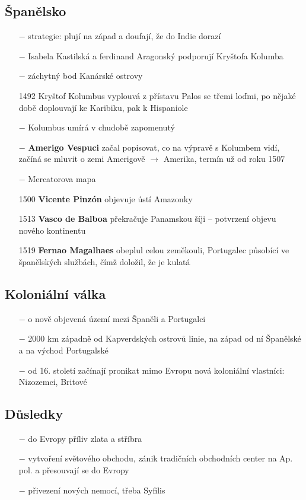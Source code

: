 \documentclass{article}
\begin{document}
\subsection*{Španělsko}
\begin{itemize}
    \vspace{-0.5em}
    \setlength\itemsep{0.15em}
    \item[$-$] strategie: plují na západ a doufají, že do Indie dorazí
    \item[$-$] Isabela Kastilská a ferdinand Aragonský podporují Kryštofa Kolumba
    \item[$-$] záchytný bod Kanárské ostrovy
    \item[1492] Kryštof Kolumbus vyplouvá z přístavu Palos se třemi loďmi, po nějaké době doplouvají ke Karibiku, pak k Hispaniole
    \item[$-$] Kolumbus umírá v chudobě zapomenutý
    \item[$-$] \textbf{Amerigo Vespuci} začal popisovat, co na výpravě s Kolumbem vidí, začíná se mluvit o zemi Amerigově $\rightarrow$ Amerika, termín už od roku 1507
    \item[$-$] Mercatorova mapa
    \item[1500] \textbf{Vicente Pinzón} objevuje ústí Amazonky
    \item[1513] \textbf{Vasco de Balboa} překračuje Panamskou šíji -- potvrzení objevu nového kontinentu
    \item[1519] \textbf{Fernao Magalhaes} obeplul celou zeměkouli, Portugalec působící ve španělských službách, čímž doložil, že je kulatá
\end{itemize}


\subsection*{Koloniální válka}
\begin{itemize}
    \vspace{-0.5em}
    \setlength\itemsep{0.15em}
    \item[$-$] o nově objevená území mezi Španěli a Portugalci
    \item[$-$] 2000 km západně od Kapverdských ostrovů linie, na západ od ní Španělské a na východ Portugalské
    \item[$-$] od 16. století začínají pronikat mimo Evropu nová koloniální vlastníci: Nizozemci, Britové
\end{itemize}

\subsection*{Důsledky}
\begin{itemize}
    \vspace{-0.5em}
    \setlength\itemsep{0.15em}
    \item[$-$] do Evropy příliv zlata a stříbra
    \item[$-$] vytvoření světového obchodu, zánik tradičních obchodních center na Ap. pol. a přesouvají se do Evropy
    \item[$-$] přivezení nových nemocí, třeba Syfilis
\end{itemize}
\end{document}
